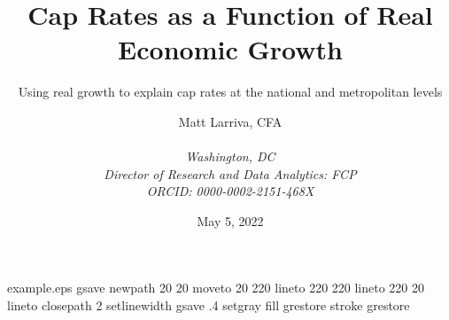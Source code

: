 \begin{filecontents*}{example.eps}
gsave
newpath
  20 20 moveto
  20 220 lineto
  220 220 lineto
  220 20 lineto
closepath
2 setlinewidth
gsave
  .4 setgray fill
grestore
stroke
grestore
\end{filecontents*}

\RequirePackage{fix-cm}
\documentclass{svjour3}                     %
\smartqed  %
\usepackage{graphicx}


\usepackage{natbib}
\usepackage{csvsimple}
\usepackage{breakcites}
\usepackage{caption}
\usepackage{blindtext}
\usepackage{amsmath}
\usepackage{float}
\usepackage{graphicx}
\usepackage{geometry}
\usepackage{longtable,array}
\usepackage{subfig}
\usepackage{graphicx}
\usepackage{url}
\captionsetup[figure]{font=normalsize}
\usepackage{pdflscape}
\usepackage [english]{babel}
\usepackage [autostyle, english = american]{csquotes}



\title{Cap Rates as a Function of Real Economic Growth}
\date{May 5, 2022}
\subtitle{Using real growth to explain cap rates at the national and metropolitan levels}
\author{Matt Larriva, CFA         \\
              \\
             \emph{Washington, DC}   \\
             \emph{Director of Research and Data Analytics: FCP}\\ %
             \emph{ORCID: 0000-0002-2151-468X}
}





\maketitle

\begin{abstract} 

We demonstrate a method to explain and forecast both national and market-level cap rate expansions as a simple binary  interaction between Gross Domestic Product and Consumer Price Index. Achieving both a strong confusion matrix and sharp outperformance versus a buy-and-hold strategy, our research contributes to the existing corpus in three ways. First, we establish a statistically significant relationship between the interaction effect of GDP and CPI versus cap rates which holds explanatory power at the national and market levels, by mapping the ground truth from a non-discrete to a binary variable.
\end{abstract}

